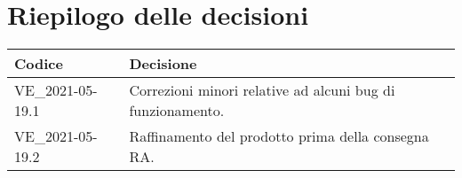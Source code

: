 \section{Riepilogo delle decisioni}
\setcounter{table}{-1}
{
\centering
\renewcommand{\arraystretch}{1.5}
\begin{longtable}{>{\centering}p{} >{}p{}}
\rowcolor{azzurro1}
\textbf{Codice} &
\centerline{\textbf{Decisione}}\\
\endhead

VE{\_}2021-05-19.1 & Correzioni minori relative ad alcuni bug di funzionamento. \\
VE{\_}2021-05-19.2 & Raffinamento del prodotto prima della consegna RA. \\
\end{longtable}
}